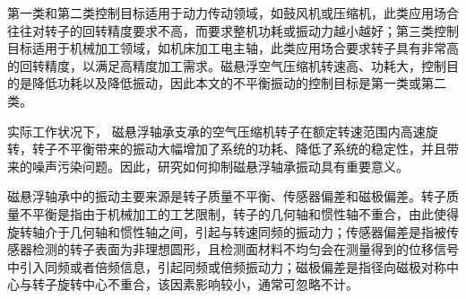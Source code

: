 \documentclass[
  lang=cn,
  degree=master,
  openany,oneside
]{nuaathesis}
\begin{document}
第一类和第二类控制目标适用于动力传动领域，如鼓风机或压缩机，此类应用场合往往对转子的回转精度要求不高，而要求整机功耗或振动力越小越好；第三类控制目标适用于机械加工领域，如机床加工电主轴，此类应用场合要求转子具有非常高的回转精度，以满足高精度加工需求。磁悬浮空气压缩机转速高、功耗大，控制目的是降低功耗以及降低振动，因此本文的不平衡振动的控制目标是第一类或第二类。

实际工作状况下， 磁悬浮轴承支承的空气压缩机转子在额定转速范围内高速旋转，转子不平衡带来的振动大幅增加了系统的功耗、降低了系统的稳定性，并且带来的噪声污染问题。因此，研究如何抑制磁悬浮轴承振动具有重要意义。

磁悬浮轴承中的振动主要来源是转子质量不平衡、传感器偏差和磁极偏差。转子质量不平衡是指由于机械加工的工艺限制，转子的几何轴和惯性轴不重合，由此使得旋转轴介于几何轴和惯性轴之间，引起与转速同频的振动力；传感器偏差是指被传感器检测的转子表面为非理想圆形，且检测面材料不均匀会在测量得到的位移信号中引入同频或者倍频信息，引起同频或倍频振动力；磁极偏差是指径向磁极对称中心与转子旋转中心不重合，该因素影响较小，通常可忽略不计。
\end{document}
